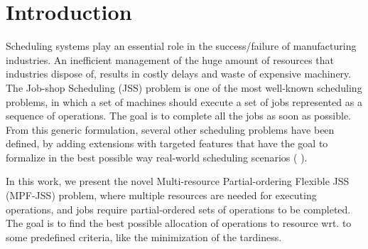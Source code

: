 \documentclass[submission,copyright,creativecommons]{eptcs}
\begin{document}
\section{Introduction}
Scheduling systems play an essential role in the success/failure of manufacturing industries. An inefficient management of the huge amount of resources that industries dispose of, results in costly delays and waste of expensive machinery. The Job-shop Scheduling (JSS) \cite{johnson1954optimal} problem is one of the most well-known scheduling problems, in which a set of machines should execute a set of jobs represented as a sequence of operations. The goal is to complete all the jobs as soon as possible. From this generic formulation, several other scheduling problems have been defined, by adding extensions with targeted features that have the goal to formalize in the best possible way real-world scheduling scenarios (\cite{brucker1990job} \cite{DBLP:journals/4or/Bellenguez-Morineau08} \cite{DBLP:journals/eor/Dauzere-PeresRL98}). %

In this work, we present the novel Multi-resource Partial-ordering Flexible JSS (MPF-JSS) problem, where multiple resources are needed for executing operations, and jobs require partial-ordered sets of operations to be completed. %
The goal is to find the best possible allocation of operations to resource wrt. to some predefined criteria, like the minimization of the tardiness. 
\end{document}
